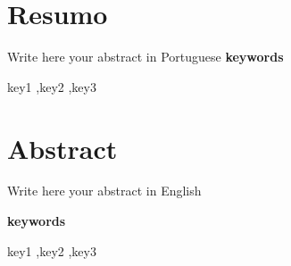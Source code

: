\chapter*{Resumo}

Write here your abstract in Portuguese
\textbf{keywords} \begin{keyword}key1 \sep key2 \sep key3 \end{keyword}
\par
\chapter*{Abstract}
Write here your abstract in English
\par
\textbf{keywords} \begin{keyword}key1 \sep key2 \sep key3 \end{keyword}